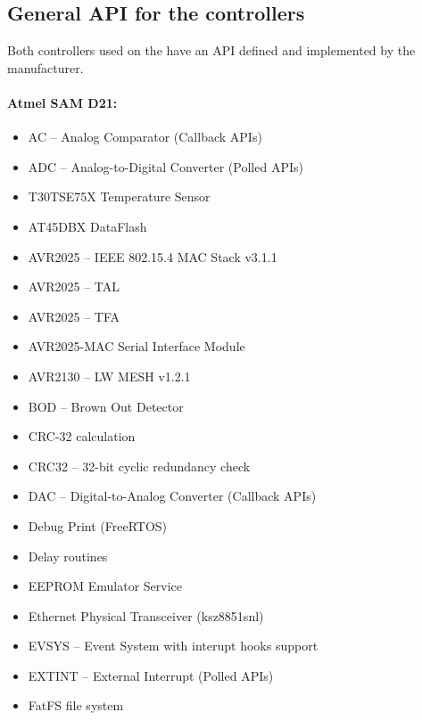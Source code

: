 \subsection{General \ac{API} for the controllers}
\label{GeneralAPI}
Both controllers used on the  have an \ac{API} defined and implemented by the manufacturer.

\paragraph{Atmel SAM D21:} \cite{AtmelSAMd20API}
\begin{multicols}{2}
    \begin{flushleft}
        \begin{itemize}
            \setlength\itemsep{1pt}
            \item AC -- Analog Comparator (Callback \ac{API}s)
            \item ADC -- Analog-to-Digital Converter (Polled \ac{API}s)
            \item T30TSE75X Temperature Sensor
            \item AT45DBX DataFlash
            \item AVR2025 -- IEEE 802.15.4 MAC Stack v3.1.1
            \item AVR2025 -- TAL
            \item AVR2025 -- TFA
            \item AVR2025-MAC Serial Interface Module
            \item AVR2130 -- LW MESH v1.2.1
            \item BOD -- Brown Out Detector
            \item CRC-32 calculation
            \item CRC32 -- 32-bit cyclic redundancy check
            \item DAC -- Digital-to-Analog Converter (Callback \ac{API}s)
            \item Debug Print (FreeRTOS)
            \item Delay routines
            \item EEPROM Emulator Service
            \item Ethernet Physical Transceiver (ksz8851snl)
            \item EVSYS -- Event System with interupt hooks support
            \item EXTINT -- External Interrupt (Polled \ac{API}s)
            \item FatFS file system

\end{itemize}
\end{flushleft}
\end{multicols}
